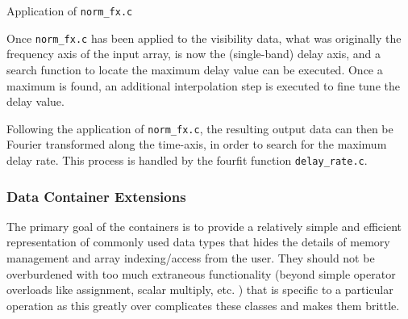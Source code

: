 \begin{algorithm}[h!]
  \caption{Application of \texttt{norm\_fx.c}}
    \begin{algorithmic}[1]
    \end{algorithmic}
  \label{algo:normfx}
\end{algorithm}

Once \texttt{norm\_fx.c} has been applied to the visibility data, what was originally the frequency axis of the input array, is now the (single-band) delay axis, and a search function to locate the maximum delay value can be executed. Once a maximum is found, an additional interpolation step is executed to fine tune the delay value.

Following the application of \texttt{norm\_fx.c}, the resulting output data can then be Fourier transformed along the time-axis, in order to search
for the maximum delay rate. This process is handled by the fourfit function \texttt{delay\_rate.c}.




\subsubsection{Data Container Extensions}

The primary goal of the containers is to provide a relatively simple and efficient representation of commonly used data types that hides the details of memory management and array indexing/access from the user. They should not be overburdened with too much extraneous functionality (beyond simple operator overloads like assignment, scalar multiply, etc. ) that is specific to a particular operation as this greatly
over complicates these classes and makes them brittle. 


